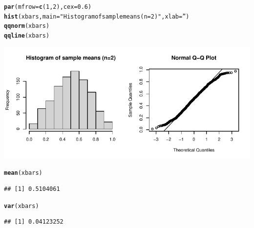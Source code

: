 \documentclass[fleqn]{article}\usepackage[]{graphicx}\usepackage[]{color}
\makeatletter
\def\maxwidth{ %
  \ifdim\Gin@nat@width>\linewidth
    \linewidth
  \else
    \Gin@nat@width
  \fi
}
\newcommand{\hlnum}[1]{\textcolor[rgb]{0.686,0.059,0.569}{#1}}%
\newcommand{\hlstr}[1]{\textcolor[rgb]{0.192,0.494,0.8}{#1}}%
\newcommand{\hlstd}[1]{\textcolor[rgb]{0.345,0.345,0.345}{#1}}%
\newcommand{\hlkwc}[1]{\textcolor[rgb]{0.333,0.667,0.333}{#1}}%
\newcommand{\hlkwd}[1]{\textcolor[rgb]{0.737,0.353,0.396}{\textbf{#1}}}%
\newenvironment{kframe}{%
 \def\at@end@of@kframe{}%
 \ifinner\ifhmode%
  \def\at@end@of@kframe{\end{minipage}}%
  \begin{minipage}{\columnwidth}%
 \fi\fi%
 \def\FrameCommand##1{\hskip\@totalleftmargin \hskip-\fboxsep
 \colorbox{shadecolor}{##1}\hskip-\fboxsep
     \hskip-\linewidth \hskip-\@totalleftmargin \hskip\columnwidth}%
 \MakeFramed {\advance\hsize-\width
   \@totalleftmargin\z@ \linewidth\hsize
   \@setminipage}}%
 {\par\unskip\endMakeFramed%
 \at@end@of@kframe}
\newenvironment{knitrout}{}{} %
\makeatother
\begin{document}
\begin{enumerate}[(a)]
\begin{knitrout}
\begin{kframe}
\begin{alltt}
\hlkwd{par}\hlstd{(}\hlkwc{mfrow}\hlstd{=}\hlkwd{c}\hlstd{(}\hlnum{1}\hlstd{,}\hlnum{2}\hlstd{),} \hlkwc{cex}\hlstd{=}\hlnum{0.6}\hlstd{)}
\hlkwd{hist}\hlstd{(xbars,} \hlkwc{main} \hlstd{=} \hlstr{"Histogram of sample means (n=2)"}\hlstd{,} \hlkwc{xlab}\hlstd{=}\hlstr{''}\hlstd{)}
\hlkwd{qqnorm}\hlstd{(xbars)}
\hlkwd{qqline}\hlstd{(xbars)}
\end{alltt}
\end{kframe}
\includegraphics[width=\maxwidth]{figure/unnamed-chunk-2-1} 
\begin{kframe}\begin{alltt}
\hlkwd{mean}\hlstd{(xbars)}
\end{alltt}
\begin{verbatim}
## [1] 0.5104061
\end{verbatim}
\begin{alltt}
\hlkwd{var}\hlstd{(xbars)}
\end{alltt}
\begin{verbatim}
## [1] 0.04123252
\end{verbatim}
\end{kframe}
\end{knitrout}
\bigskip

% 
% 
\clearpage


\end{enumerate}
\end{document}
